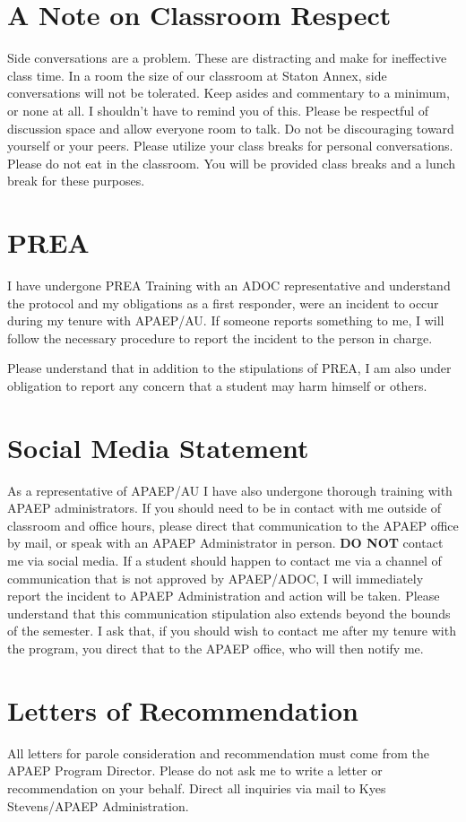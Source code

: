 \section{A Note on Classroom Respect}
Side conversations are a problem. These are distracting and make for
ineffective class time. In a room the size of our classroom at Staton Annex,
side conversations will not be tolerated. Keep asides and commentary to a
minimum, or none at all. I shouldn't have to remind you of this. Please be
respectful of discussion space and allow everyone room to talk. Do not be
discouraging toward yourself or your peers. Please utilize your class breaks
for personal conversations. Please do not eat in the classroom. You will be
provided class breaks and a lunch break for these purposes.

\section{PREA}
I have undergone PREA Training with an ADOC representative and understand the
protocol and my obligations as a first responder, were an incident to occur
during my tenure with APAEP/AU. If someone reports something to me, I will
follow the necessary procedure to report the incident to the person in charge.

Please understand that in addition to the stipulations of PREA, I am also under
obligation to report any concern that a student may harm himself or others. 

\section{Social Media Statement}
As a representative of APAEP/AU I have also undergone thorough training with
APAEP administrators. If you should need to be in contact with me outside of
classroom and office hours, please direct that communication to the APAEP
office by mail, or speak with an APAEP Administrator in person. \textbf{DO NOT}
contact me via social media. If a student should happen to contact me via a
channel of communication that is not approved by APAEP/ADOC, I will immediately
report the incident to APAEP Administration and action will be taken. Please
understand that this communication stipulation also extends beyond the bounds
of the semester. I ask that, if you should wish to contact me after my tenure
with the program, you direct that to the APAEP office, who will then notify me.

\section{Letters of Recommendation}
All letters for parole consideration and recommendation must come from the
APAEP Program Director. Please do not ask me to write a letter or
recommendation on your behalf. Direct all inquiries via mail to Kyes
Stevens/APAEP Administration.


